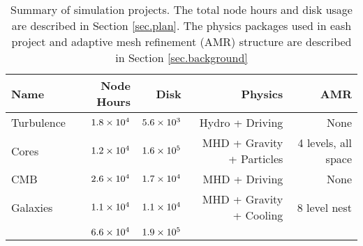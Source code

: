 

\begin{table}[h]
\begin{center}
    \caption{Summary of simulation projects.  The total node hours and disk
    usage are described in Section \ref{sec.plan}.  The physics packages used in
    eash project and
    adaptive mesh refinement (AMR) structure are described in Section
    \ref{sec.background}}
\begin{tabular}{lrrrr}\label{table1}
Name    &    Node Hours    &    Disk    &    Physics     &    AMR    \\
\hline
Turbulence    &   $1.8\times {10^{4}}$  &   $5.6\times {10^{3}}$  &    Hydro + Driving    &    None    \\
Cores         &   $1.2\times {10^{4}}$  &   $1.6\times {10^{5}}$  &    MHD + Gravity + Particles    &    4 levels, all space    \\
CMB           &   $2.6\times {10^{4}}$  &   $1.7\times {10^{4}}$  &    MHD + Driving    &    None    \\
Galaxies      &   $1.1\times {10^{4}}$  &   $1.1\times {10^{4}}$  &    MHD + Gravity + Cooling  &    8 level nest    \\
\hline
&    $6.6\times {10^{4}}$    &    $1.9\times {10^{5}}$   &        &        \\
\end{tabular}
\end{center}
\end{table}


